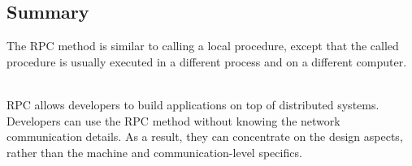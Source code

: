 \subsection{Summary}\label{mjsgWV3R9-YDUsFkgHa90}

\hfill\break
The RPC method is similar to calling a local procedure, except that the called procedure is usually executed in a different process and on a different computer.\\
\strut \\
RPC allows developers to build applications on top of distributed systems. Developers can use the RPC method without knowing the network communication details. As a result, they can concentrate on the design aspects, rather than the machine and communication-level specifics.\\
\strut \\

